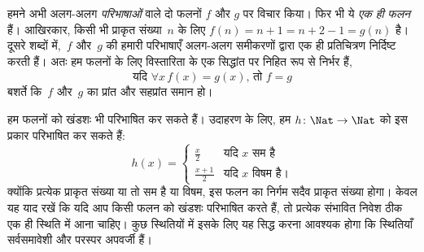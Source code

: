 \documentclass[../../../include/open-logic-section]{subfiles}
\begin{document}
\begin{explain}
हमने अभी अलग-अलग \emph{परिभाषाओं} वाले दो फलनों $f$ और $g$ पर विचार किया।
फिर भी ये \emph{एक ही फलन} हैं। आखिरकार, किसी भी प्राकृत संख्या~$n$ के लिए
$f(n) = n+1 = n+2-1 =
g(n)$ है। दूसरे शब्दों में,~$f$ और~$g$ की हमारी
परिभाषाएँ अलग-अलग समीकरणों द्वारा एक ही प्रतिचित्रण निर्दिष्ट करती हैं। अतः
हम फलनों के लिए विस्तारिता के एक सिद्धांत पर निहित रूप से निर्भर हैं,
\[
  \text{यदि }\forall x\, f(x) = g(x)\text{, तो }f = g
\]
बशर्ते कि~$f$ और~$g$ का प्रांत और सहप्रांत समान हो।
\end{explain}

\begin{ex}
हम फलनों को खंडशः भी परिभाषित कर सकते हैं। उदाहरण के लिए, हम
$h \colon \Nat \to \Nat$ को इस प्रकार परिभाषित कर सकते हैं:
\[
h(x) =
\begin{cases}
  \frac{x}{2} & \text{यदि $x$ सम है} \\
  \frac{x+1}{2} & \text{यदि $x$ विषम है।}
\end{cases}
\]
क्योंकि प्रत्येक प्राकृत संख्या या तो सम है या विषम, इस फलन का निर्गम सदैव
प्राकृत संख्या होगा। केवल यह याद रखें कि यदि आप किसी फलन को खंडशः परिभाषित
करते हैं, तो प्रत्येक संभावित निवेश ठीक एक ही स्थिति में आना चाहिए। कुछ
स्थितियों में इसके लिए यह सिद्ध करना आवश्यक होगा कि स्थितियाँ सर्वसमावेशी
और परस्पर अपवर्जी हैं।
\end{ex}
\end{document}

